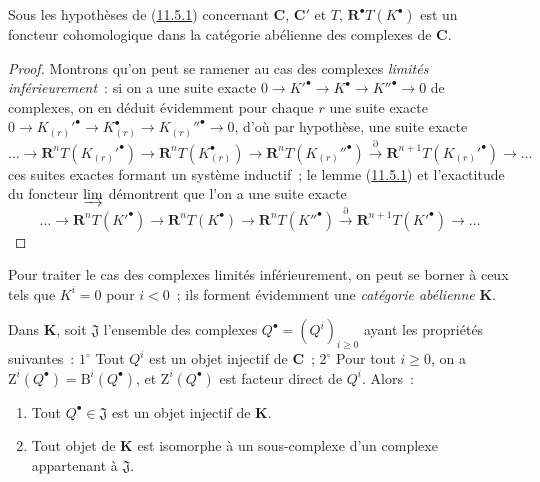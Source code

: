 \begin{proposition}[11.5.2]
\label{0.11.5.2-fr}
Sous les hypothèses de \textup{(\hyperref[0.11.5.1-fr]{11.5.1})} concernant
$\boldsymbol{C}$, $\boldsymbol{C}'$ et $T$, $\mathbf R^\bullet T(K^\bullet)$ est un
foncteur cohomologique dans la catégorie abélienne des complexes de
$\boldsymbol{C}$.
\end{proposition}

\begin{proof}
Montrons qu'on peut se ramener au cas des complexes \emph{limités inférieurement}~:
si on a une suite exacte
$0\longrightarrow K'^\bullet\longrightarrow K^\bullet\longrightarrow K''^\bullet\longrightarrow0$
de complexes, on en déduit évidemment pour chaque $r$ une suite exacte
$0\longrightarrow K_{(r)}'^\bullet\longrightarrow K_{(r)}^\bullet\longrightarrow K_{(r)}''^\bullet\longrightarrow0$,
d'où par hypothèse, une suite exacte
\[
  \ldots\longrightarrow\mathbf R^nT(K_{(r)}'^\bullet)
  \longrightarrow\mathbf R^nT(K_{(r)}^\bullet)
  \longrightarrow\mathbf R^nT(K_{(r)}''^\bullet)
  \xrightarrow{\partial}\mathbf R^{n+1}T(K_{(r)}'^\bullet)
  \longrightarrow\ldots
\]
ces suites exactes formant un système inductif~; le lemme
(\hyperref[0.11.5.1-fr]{11.5.1}) et l'exactitude du foncteur $\varinjlim$
démontrent que l'on a une suite exacte
\[
  \ldots\longrightarrow\mathbf R^nT(K'^\bullet)
  \longrightarrow\mathbf R^nT(K^\bullet)
  \longrightarrow\mathbf R^nT(K''^\bullet)
  \xrightarrow{\partial}\mathbf R^{n+1}T(K'^\bullet)
  \longrightarrow\ldots
\]
\end{proof}

Pour traiter le cas des complexes limités inférieurement, on peut se borner à
ceux tels que $K^i=0$ pour $i<0$~; ils forment évidemment une \emph{catégorie
abélienne} $\boldsymbol{K}$.

\begin{lemma}[11.5.2.1]
\label{0.11.5.2.1-fr}
Dans $\boldsymbol{K}$, soit $\mathfrak J$ l'ensemble des complexes
$Q^\bullet=(Q^i)_{i\geq0}$ ayant les
propriétés suivantes~: $1^\circ$ Tout $Q^i$ est un objet injectif de $\boldsymbol{C}$~;
$2^\circ$ Pour tout $i\geq0$, on a
$\mathrm Z^i(Q^\bullet)=\mathrm B^i(Q^\bullet)$, et
$\mathrm Z^i(Q^\bullet)$ est facteur direct de $Q^i$. Alors~:
\begin{enumerate}
  \item[\textup{(i)}] Tout $Q^\bullet\in\mathfrak J$ est un objet injectif de
    $\boldsymbol{K}$.
  \item[\textup{(ii)}] Tout objet de $\boldsymbol{K}$ est isomorphe à un sous-complexe
    d'un complexe appartenant à $\mathfrak J$.
\end{enumerate}
\end{lemma}

